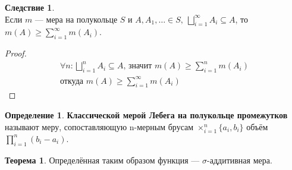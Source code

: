 \documentclass[11pt,a4paper]{report}
\theoremstyle{definition}
\theoremstyle{definition}
\newtheorem{theorem}{Теорема}[section]
\newtheorem{corollary}{Следствие}[section]
\theoremstyle{definition}
\newtheorem{definition}{Определение}[section]
\begin{document}
	\begin{corollary}$  $\\
		Если $ m $ — мера на полукольце $ S $ и $ A, A_{1}, \ldots \in S,\ \bigsqcup_{i=1}^{\infty}{A_{i}} \subseteq A $, то $ m(A) \ge \sum_{i=1}^{\infty}{m(A_{i})} $. 
	\end{corollary}
	\begin{proof}
		\begin{gather*} 
			\forall n: \bigsqcup\limits_{i=1}^{n} A_{i} \subseteq A\text{, значит } m(A) \ge \sum_{i=1}^{n}m(A_{i})\\
			\text{откуда } m(A) \ge \sum_{i=1}^{\infty} m(A_{i})
		\end{gather*}
	\end{proof}
	\begin{definition}
		\textbf{Классической мерой Лебега на полукольце промежутков} называют меру, сопоставляющую n-мерным брусам $ \times_{i=1}^{n} \{a_{i}, b_{i}\} $ объём $ \prod_{i=1}^{n}{(b_{i} - a_{i})} $.
	\end{definition}
	\begin{theorem}
		Определённая таким образом функция — $ \sigma $-аддитивная мера.
	\end{theorem}
\end{document}
